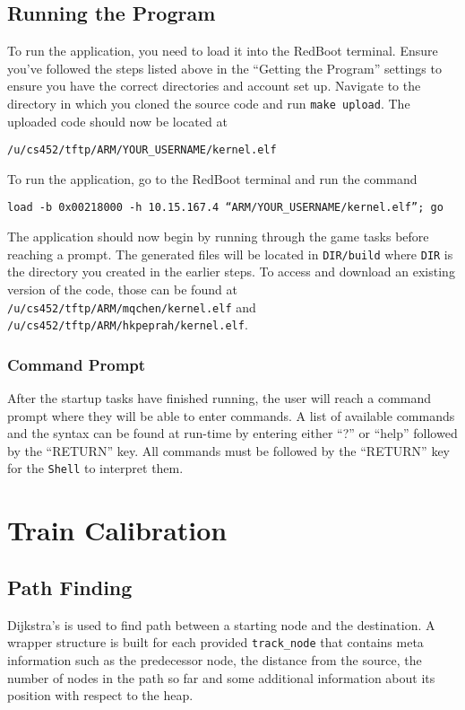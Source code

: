 \documentclass[12pt]{article}
\begin{document}
\subsection{Running the Program}
To run the application, you need to load it into the RedBoot terminal.  Ensure you've followed the steps listed above in the ``Getting the Program'' settings to ensure you have the correct directories and account set up.  Navigate to the directory in which you cloned the source code and run \texttt{make upload}.  The uploaded code should now be located at
\begin{center}
  \texttt{/u/cs452/tftp/ARM/YOUR\_USERNAME/kernel.elf}
\end{center}
To run the application, go to the RedBoot terminal and run the command
\begin{center}
  \texttt{load -b 0x00218000 -h 10.15.167.4 ``ARM/YOUR\_USERNAME/kernel.elf''; go}
\end{center}
The application should now begin by running through the game tasks before reaching a prompt.  The generated files will be located in \texttt{DIR/build} where \texttt{DIR} is the directory you created in the earlier steps.  To access and download an existing version of the code, those can be found at \texttt{/u/cs452/tftp/ARM/mqchen/kernel.elf} and \texttt{/u/cs452/tftp/ARM/hkpeprah/kernel.elf}.
\\
\subsubsection{Command Prompt}
After the startup tasks have finished running, the user will reach a command prompt where they will be able to enter commands.  A list of available commands and the syntax can be found at run-time by entering either ``?'' or ``help'' followed by the ``RETURN'' key.  All commands must be followed by the ``RETURN'' key for the {\tt Shell} to interpret them.
\\[2\baselineskip]
\section{Train Calibration}
\subsection{Path Finding}
Dijkstra's is used to find path between a starting node and the destination. A wrapper structure is built for each
provided \texttt{track\_node} that contains meta information such as the predecessor node, the distance from the source,
the number of nodes in the path so far and some additional information about its position with respect to the heap.
\end{document}
